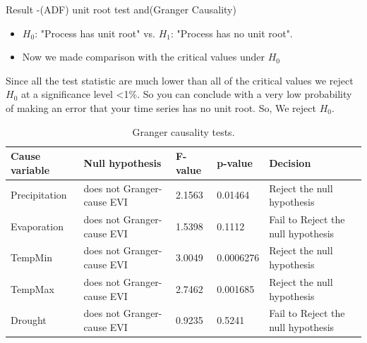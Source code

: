 \documentclass[11pt]{beamer}
\begin{document}
\begin{frame}{Result -(ADF) unit root test and(Granger Causality)}
	\begin{itemize}
		\item  $H_{0}$: "Process has unit root" vs. $H_{1}$: "Process has no unit root". 
		\item Now we made comparison with the critical values under $H_{0}$
	\end{itemize}
	Since all the test statistic are much lower than all of the critical values we reject $H_{0}$ at a significance level   <1\%. So you can conclude with a very low probability of making an error that your time series has no unit root. So, We reject $H_{0}$.
	\begin{table}[]
		\label{label:Optimal lag}
		\caption{Granger causality tests.}
		\centering
		\small
		\addtolength{\tabcolsep}{-4pt}
		\begin{tabularx}{\textwidth}{@{}lllll@{}}
			\hline
			Cause variable &Null hypothesis& F-value& p-value& Decision\\
			\hline\hline
			Precipitation	& does not Granger-cause EVI &2.1563  & 0.01464  & Reject the null hypothesis  \\
			\hline
			Evaporation	& does not Granger-cause EVI & 1.5398 & 0.1112 &Fail to Reject the null hypothesis  \\
			\hline
			TempMin	&  does not Granger-cause EVI&3.0049  & 0.0006276 &Reject the null hypothesis  \\
			\hline
			TempMax	& does not Granger-cause EVI&2.7462  & 0.001685 &Reject the null hypothesis  \\
			\hline
			Drought	& does not Granger-cause EVI & 0.9235 & 0.5241 &Fail to Reject the null hypothesis \\
			\hline
		\end{tabularx}
	\end{table}
\end{frame}
%	
\end{document}

